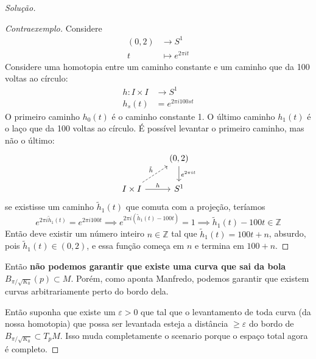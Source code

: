 \begin{proof}[Solução]
\begin{proof}[Contraexemplo]\leavevmode
Considere 
\begin{align*}
	(0,2) &\longrightarrow S^1 \\
	t &\longmapsto e^{2\pi it}
\end{align*}
Considere uma homotopia entre um caminho constante e um caminho que da 100 voltas ao círculo:
\begin{align*}
	h: I \times I &\longrightarrow S^1 \\
	h_s(t)&=e^{2\pi i100 s t }
\end{align*}
O primeiro caminho \(h_0(t)\) é o caminho constante 1. O último caminho \(h_1(t)\) é o laço que da 100 voltas ao círculo. É possível levantar o primeiro caminho, mas não o último:
\[\begin{tikzcd}
& (0,2)\arrow[d,"e^{2\pi i t}"]\\
I\times I \arrow[ur,dashed,"\tilde{h}"]\arrow[r,"h"]&S^1
\end{tikzcd}\]
se existisse um caminho \(\tilde{h}_1(t)\) que comuta com a projeção, teríamos
\[e^{2\pi i\tilde{h}_1(t)}=e^{2\pi i 100t}\implies e^{2\pi i(\tilde{h}_1(t)-100t)}=1 \implies \tilde{h}_1(t)-100t\in  \mathbb{Z}\]
Então deve existir um número inteiro \(n \in \mathbb{Z}\) tal que \(\tilde{h}_1(t)=100t+n\), absurdo, pois \(\tilde{h}_1(t) \in (0,2)\), e essa função começa em \(n\) e termina em \(100+n\). 
\end{proof}
Então \textbf{não podemos garantir que existe uma curva que sai da bola \(B_{\pi/\sqrt{K_0}}(p)\subset M\)}. Porém, como aponta Manfredo, podemos garantir que existem curvas arbitrariamente perto do bordo dela.

Então suponha que existe um \(\varepsilon>0\) que tal que o levantamento de toda curva (da nossa homotopia) que possa ser levantada esteja a distância \(\geq \varepsilon\) do bordo de \(B_{\pi/\sqrt{K_0}}\subset T_pM\). Isso muda completamente o scenario porque o espaço total agora é completo.


\end{proof}
